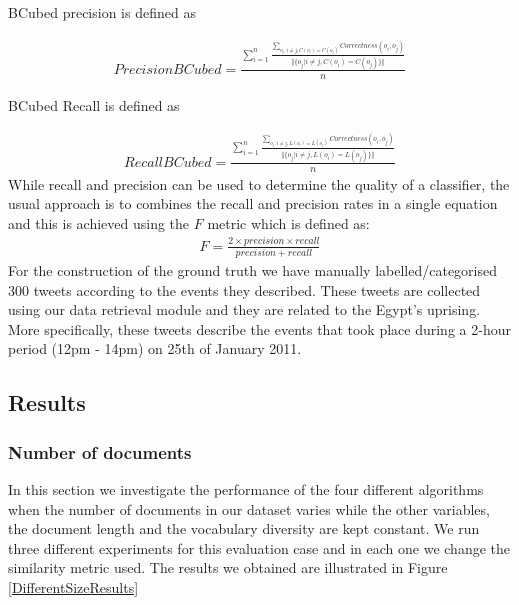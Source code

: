 BCubed precision is defined as 

\begin{eqnarray}
Precision BCubed = \frac{ \sum_{i=1}^{n} \frac{\sum_{o_j:i \neq j, C(o_i)=C(o_j)}^{} Correctness(o_i, o_j)}{\Vert \{ o_j | i \neq j, C(o_i) = C(o_j)  \}  \Vert} }{n}
\end{eqnarray} 

BCubed Recall is defined as

\begin{eqnarray}
Recall BCubed = \frac{ \sum_{i=1}^{n} \frac{\sum_{o_j:i \neq j, L(o_i)=L(o_j)}^{} Correctness(o_i, o_j)}{\Vert \{ o_j | i \neq j, L(o_i) = L(o_j)  \}  \Vert} }{n}
\end{eqnarray} 
While recall and precision can be used to determine the quality of a classifier, the usual approach is to combines the recall and precision rates in a single equation and this is 
achieved using the $F$ metric which is defined as:
\begin{eqnarray}
F = \frac{2 \times precision \times recall}{precision + recall}
\end{eqnarray} 
For the construction of the ground truth we have manually labelled/categorised 300 tweets according to the events they described. These tweets are collected using our data retrieval module and they are related to the Egypt's uprising. More specifically, these tweets describe the events that took place during a 2-hour period (12pm - 14pm) on 25th of January 2011.    
    
\subsection{Results}
\subsubsection{Number of documents}
In this section we investigate the performance of the four different algorithms when the number of documents in our dataset varies while the other variables, the document length and the vocabulary diversity are kept constant. We run three different experiments for this evaluation case and in each one we change the similarity metric used. The results we obtained are illustrated in Figure \ref{DifferentSizeResults}

